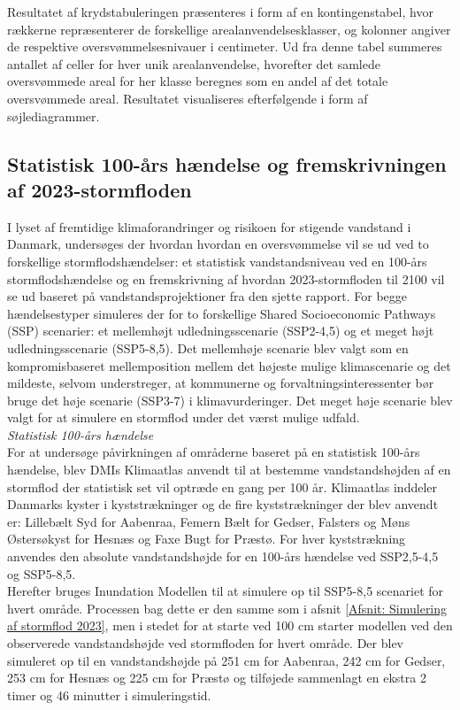 Resultatet af krydstabuleringen præsenteres i form af en kontingenstabel, hvor rækkerne repræsenterer de forskellige arealanvendelsesklasser, og kolonner angiver de respektive oversvømmelsesnivauer i centimeter. Ud fra denne tabel summeres antallet af celler for hver unik arealanvendelse, hvorefter det samlede oversvømmede areal for her klasse beregnes som en andel af det totale oversvømmede areal. Resultatet visualiseres efterfølgende i form af søjlediagrammer.

\subsection{Statistisk 100-års hændelse og fremskrivningen af 2023-stormfloden} \label{Afsnit: Fremskrivning og statistisk}
I lyset af fremtidige klimaforandringer og risikoen for stigende vandstand i Danmark, undersøges der hvordan hvordan en oversvømmelse vil se ud ved to forskellige stormflodshændelser: et statistisk vandstandsniveau ved en 100-års stormflodshændelse og en fremskrivning af hvordan 2023-stormfloden til 2100 vil se ud baseret på vandstandsprojektioner fra den sjette \cite{ipcc_report_AR6} rapport. For begge hændelsestyper simuleres der for to forskellige Shared Socioeconomic Pathways (SSP) scenarier: et mellemhøjt udledningsscenarie (SSP2-4,5) og et meget højt udledningsscenarie (SSP5-8,5). Det mellemhøje scenarie blev valgt som en kompromisbaseret mellemposition mellem det højeste mulige klimascenarie og det mildeste, selvom \cite{dmi_ny_nodate} understreger, at kommunerne og forvaltningsinteressenter bør bruge det høje scenarie (SSP3-7) i klimavurderinger. Det meget høje scenarie blev valgt for at simulere en stormflod under det værst mulige udfald.\\

{\large \textit{Statistisk 100-års hændelse}}\\
For at undersøge påvirkningen af områderne baseret på en statistisk 100-års hændelse, blev DMIs Klimaatlas anvendt til at bestemme vandstandshøjden af en stormflod der statistisk set vil optræde en gang per 100 år. Klimaatlas inddeler Danmarks kyster i kyststrækninger og de fire kyststrækninger der blev anvendt er: Lillebælt Syd for Aabenraa, Femern Bælt for Gedser, Falsters og Møns Østersøkyst for Hesnæs og Faxe Bugt for Præstø. For hver kyststrækning anvendes den absolute vandstandshøjde for en 100-års hændelse ved SSP2,5-4,5 og SSP5-8,5.\\

Herefter bruges Inundation Modellen til at simulere op til SSP5-8,5 scenariet for hvert område. Processen bag dette er den samme som i afsnit \ref{Afsnit: Simulering af stormflod 2023}, men i stedet for at starte ved 100 cm starter modellen ved den observerede vandstandshøjde ved stormfloden for hvert område. Der blev simuleret op til en vandstandshøjde på 251 cm for Aabenraa, 242 cm for Gedser, 253 cm for Hesnæs og 225 cm for Præstø og tilføjede sammenlagt en ekstra 2 timer og 46 minutter i simuleringstid. \\

